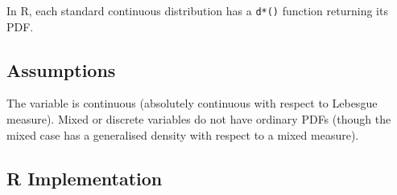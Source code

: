 \documentclass[
]{article}
\begin{document}
In R, each standard continuous distribution has a \texttt{d*()} function
returning its PDF.

\subsection{Assumptions}\label{assumptions}

The variable is continuous (absolutely continuous with respect to
Lebesgue measure). Mixed or discrete variables do not have ordinary PDFs
(though the mixed case has a generalised density with respect to a mixed
measure).

\subsection{R Implementation}\label{r-implementation}
\end{document}
